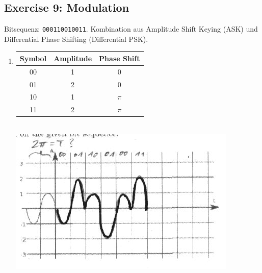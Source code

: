 \documentclass[10pt,a4paper]{scrartcl}
\begin{document}
\subsection*{Exercise 9: Modulation}
Bitsequenz: \texttt{000110010011}. Kombination aus Amplitude Shift Keying (ASK) und Differential Phase Shifting (Differential PSK).\\
\begin{enumerate}
\item
\begin{tabular}{|c|c|c|}
\hline Symbol & Amplitude & Phase Shift \\
\hline 00 & 1 & 0 \\ 
\hline 01 & 2 & 0 \\ 
\hline 10 & 1 & $\pi$ \\ 
\hline 11 & 2 & $\pi$ \\ 
\hline 
\end{tabular} \\
\includegraphics[scale=2]{a3e9_1.jpg}


\end{enumerate}
\end{document}
